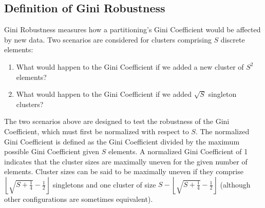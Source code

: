 \documentclass[8pt]{extarticle}
\begin{document}
%
%
%
%
%
%

    \subsection*{Definition of Gini Robustness}

    Gini Robustness measures how a partitioning's Gini Coefficient would be affected by new data.
    Two scenarios are considered for clusters comprising $S$ discrete elements:

    \begin{enumerate}
        \item What would happen to the Gini Coefficient if we added a new cluster of $S^2$ elements?
        \item What would happen to the Gini Coefficient if we added $\sqrt{S} $ singleton clusters?
    \end{enumerate}

    The two scenarios above are designed to test the robustness of the Gini Coefficient, which must first be normalized with respect to $S$.
    The normalized Gini Coefficient is defined as the Gini Coefficient divided by the maximum possible Gini Coefficient given $S$ elements.
    A normalized Gini Coefficient of 1 indicates that the cluster sizes are maximally uneven for the given number of elements.
    Cluster sizes can be said to be maximally uneven if they comprise $\left\lfloor\sqrt{S+\frac{1}{4}}-\frac{1}{2}\right\rfloor$ singletons and one cluster of size $S - \left\lfloor\sqrt{S+\frac{1}{4}}-\frac{1}{2}\right\rfloor$ (although other configurations are sometimes equivalent).
\end{document}
